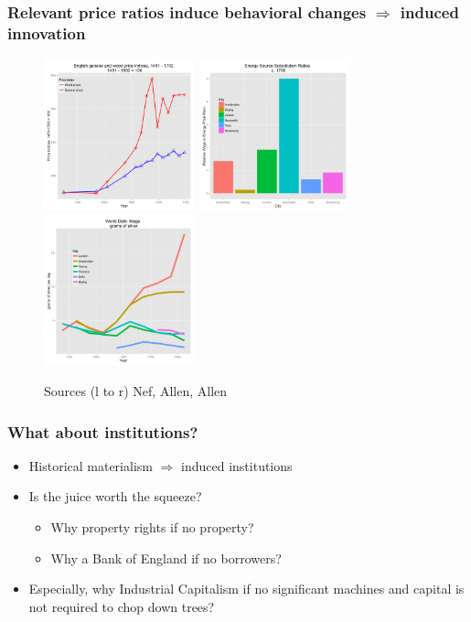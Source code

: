 \documentclass[final]{beamer}
\begin{document}
\begin{frame}
\frametitle{Relevant price ratios induce behavioral changes $\Rightarrow$ induced innovation} %
\begin{figure}[p!]
\label{fig:wage-energy}
		\caption{Sources (l to r) Nef, Allen, Allen}
		\centerline{
		\mbox{\includegraphics[width=0.39\textwidth]{woodPrice}}
		\mbox{\includegraphics[width=0.39\textwidth]{wage-energy}}
		\mbox{\includegraphics[width=0.39\textwidth]{gworldwages}}
		}
\end{figure}
\end{frame}

\begin{frame}
\frametitle{What about institutions?}
\begin{itemize}
\item Historical materialism \pause $\Rightarrow$ induced institutions\pause
\item Is the juice worth the squeeze? \pause 
	\begin{itemize}
	\item Why property rights if no property? \pause 
	\item Why a Bank of England if no borrowers? \pause 
	\end{itemize}
\item Especially, why Industrial Capitalism if no significant machines and capital is not required to chop down trees?
\end{itemize}
\end{frame}
\end{document}

